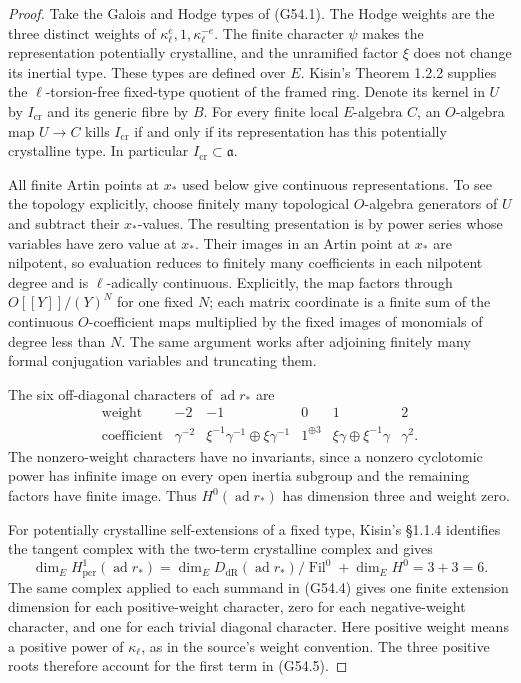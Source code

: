 \begin{proof}
Take the Galois and Hodge types of (G54.1).  The Hodge weights
are the three distinct weights of $\kappa_\ell^e,1,
\kappa_\ell^{-e}$.  The finite character $\psi$ makes the
representation potentially crystalline, and the unramified
factor $\xi$ does not change its inertial type.
These types are defined over $E$.
Kisin's Theorem 1.2.2 supplies the $\ell$-torsion-free
fixed-type quotient of the framed ring.  Denote its kernel in
$U$ by $I_{\mathrm{cr}}$ and its generic fibre by $B$.
For every finite local $E$-algebra $C$, an $O$-algebra map
$U\to C$ kills $I_{\mathrm{cr}}$ if and only if its
representation has this potentially crystalline type.
In particular $I_{\mathrm{cr}}\subset\mathfrak a$.

All finite Artin points at $x_*$ used below give continuous
representations.  To see the topology explicitly, choose
finitely many topological $O$-algebra generators of $U$ and
subtract their $x_*$-values.  The resulting presentation is
by power series whose variables have zero value at $x_*$.
Their images in an Artin point at $x_*$ are nilpotent, so
evaluation reduces to finitely many coefficients in each
nilpotent degree and is $\ell$-adically continuous.  Explicitly,
the map factors through $O[[Y]]/(Y)^N$ for one fixed $N$;
each matrix coordinate is a finite sum of the continuous
$O$-coefficient maps multiplied by the fixed images of
monomials of degree less than $N$.
The same argument works after adjoining finitely many formal
conjugation variables and truncating them.

The six off-diagonal characters of $\operatorname{ad}r_*$ are
\[
\begin{array}{c|ccccc}
\text{weight}&-2&-1&0&1&2\\ \hline
\text{coefficient}&\gamma^{-2}&
 \xi^{-1}\gamma^{-1}\oplus\xi\gamma^{-1}&
 1^{\oplus3}&\xi\gamma\oplus\xi^{-1}\gamma&\gamma^2.
\end{array}                                                  \tag{G54.4}
\]
The nonzero-weight characters have no invariants, since a
nonzero cyclotomic power has infinite image on every open
inertia subgroup and the remaining factors have finite image.
Thus $H^0(\operatorname{ad}r_*)$ has dimension three and
weight zero.

For potentially crystalline self-extensions of a fixed
type, Kisin's \S1.1.4 identifies the tangent complex with
the two-term crystalline complex and gives
\[
 \dim_E H^1_{\mathrm{pcr}}(\operatorname{ad}r_*)
 =\dim_E D_{\mathrm{dR}}(\operatorname{ad}r_*)/
                 \operatorname{Fil}^0+\dim_E H^0=3+3=6.
                                                               \tag{G54.5}
\]
The same complex applied to each summand in (G54.4) gives
one finite extension dimension for each positive-weight
character, zero for each negative-weight character, and
one for each trivial diagonal character.  Here positive
weight means a positive power of $\kappa_\ell$, as in the
source's weight convention.  The three positive roots
therefore account for the first term in (G54.5).


\end{proof}
